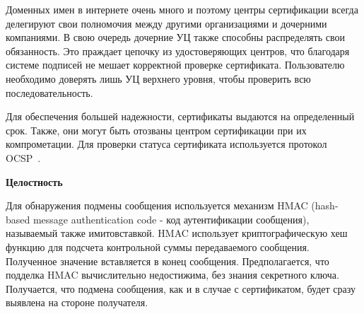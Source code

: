 Доменных имен в интернете очень много и поэтому центры сертификации всегда делегируют свои полномочия между другими организациями и дочерними компаниями. В свою очередь дочерние УЦ также способны распределять свои обязанность. Это праждает цепочку из удостоверяющих центров, что благодаря системе подписей не мешает корректной проверке сертификата. Пользователю необходимо доверять лишь УЦ верхнего уровня, чтобы проверить всю последовательность.

Для обеспечения большей надежности, сертификаты выдаются на определенный срок. Также, они могут быть отозваны центром сертификации при их компрометации. Для проверки статуса сертификата используется протокол OCSP~\cite{OCSP}.

\textbf{Целостность}

Для обнаружения подмены сообщения используется механизм HMAC (hash-based message authentication code - код аутентификации сообщения), называемый также имитовставкой. HMAC использует криптографическую хеш функцию для подсчета контрольной суммы передаваемого сообщения. Полученное значение вставляется в конец сообщения. Предполагается, что подделка HMAC вычислительно недостижима, без знания секретного ключа. Получается, что подмена сообщения, как и в случае с сертификатом, будет сразу выявлена на стороне получателя.
